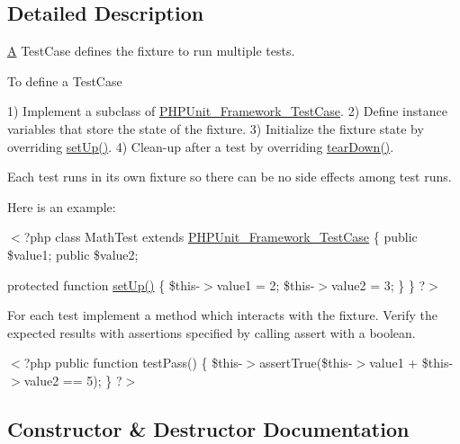 \subsection{Detailed Description}
\mbox{\hyperlink{class_a}{A}} Test\+Case defines the fixture to run multiple tests.

To define a Test\+Case

1) Implement a subclass of \mbox{\hyperlink{class_p_h_p_unit___framework___test_case}{P\+H\+P\+Unit\+\_\+\+Framework\+\_\+\+Test\+Case}}. 2) Define instance variables that store the state of the fixture. 3) Initialize the fixture state by overriding \mbox{\hyperlink{class_p_h_p_unit___framework___test_case_a0bc688732d2b3b162ffebaf7812e78da}{set\+Up()}}. 4) Clean-\/up after a test by overriding \mbox{\hyperlink{class_p_h_p_unit___framework___test_case_a80fe3d17e658907fc75346a0ec9d6fc7}{tear\+Down()}}.

Each test runs in its own fixture so there can be no side effects among test runs.

Here is an example\+:

{\ttfamily  $<$?php class Math\+Test extends \mbox{\hyperlink{class_p_h_p_unit___framework___test_case}{P\+H\+P\+Unit\+\_\+\+Framework\+\_\+\+Test\+Case}} \{ public \$value1; public \$value2;}

{\ttfamily  protected function \mbox{\hyperlink{class_p_h_p_unit___framework___test_case_a0bc688732d2b3b162ffebaf7812e78da}{set\+Up()}} \{ \$this-\/$>$value1 = 2; \$this-\/$>$value2 = 3; \} \} ?$>$ }

For each test implement a method which interacts with the fixture. Verify the expected results with assertions specified by calling assert with a boolean.

{\ttfamily  $<$?php public function test\+Pass() \{ \$this-\/$>$assert\+True(\$this-\/$>$value1 + \$this-\/$>$value2 == 5); \} ?$>$ } 

\subsection{Constructor \& Destructor Documentation}
\mbox{\label{class_p_h_p_unit___framework___test_case_a9cfbfbed4e4bc82d7653086cbac0d2f6}} 
